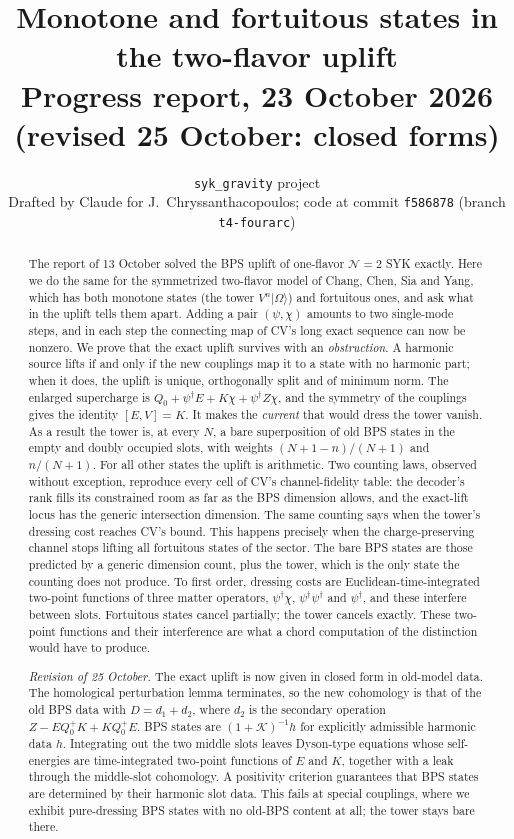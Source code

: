 \documentclass[11pt]{article}
\title{\bf Monotone and fortuitous states in the two-flavor uplift\\[6pt]\large Progress report, 23 October 2026 (revised 25 October: closed forms)}
\author{\texttt{syk\_gravity} project\\[2pt]\small Drafted by Claude for J.~Chryssanthacopoulos; code at commit
\texttt{f586878} (branch \texttt{t4-fourarc})}
\date{}
\newcommand{\Om}{|\Omega\rangle}
\theoremstyle{plain}
\theoremstyle{remark}
\numberwithin{equation}{section}
\begin{document}
\maketitle

\begin{abstract}
\noindent
The report of 13 October solved the BPS uplift of one-flavor $\mathcal N=2$ SYK exactly. Here we do the same for the
symmetrized two-flavor model of Chang, Chen, Sia and Yang, which has both monotone states (the tower $V^n\Om$) and
fortuitous ones, and ask what in the uplift tells them apart. Adding a pair $(\psi,\chi)$ amounts to two single-mode
steps, and in each step the connecting map of CV's long exact sequence can now be nonzero. We prove that the exact uplift
survives with an \emph{obstruction}. A harmonic source lifts if and only if the new couplings map it to a state with no
harmonic part; when it does, the uplift is unique, orthogonally split and of minimum norm. The enlarged supercharge is
$Q_0+\psi^\dagger E+K\chi+\psi^\dagger Z\chi$, and the symmetry of the couplings gives the identity $[E,V]=K$. It
makes the \emph{current} that would dress the tower vanish. As a result the tower is, at every $N$, a bare superposition
of old BPS states in the empty and doubly occupied slots, with weights $(N+1-n)/(N+1)$ and $n/(N+1)$. For all other
states the uplift is arithmetic. Two counting laws, observed without exception, reproduce every cell of CV's
channel-fidelity table: the decoder's rank fills its constrained room as far as the BPS dimension allows, and the
exact-lift locus has the generic intersection dimension. The same counting says when the tower's dressing cost reaches
CV's bound. This happens precisely when the
charge-preserving channel stops lifting all fortuitous states of the sector. The bare BPS states are those predicted by a
generic dimension count, plus the tower, which is the only state the counting does not produce. To first order, dressing
costs are Euclidean-time-integrated two-point functions of three matter operators, $\psi^\dagger\chi$,
$\psi^\dagger\psi^\dagger$ and $\psi^\dagger$, and these interfere between slots. Fortuitous states cancel partially; the
tower cancels exactly. These two-point functions and their interference are what a chord computation of the distinction
would have to produce.

\smallskip\noindent\emph{Revision of 25 October.} The exact uplift is now given in closed form in old-model data.
The homological perturbation lemma terminates, so the new cohomology is that of the old BPS data with
$D=d_1+d_2$, where $d_2$ is the secondary operation $Z-EQ_0^+K+KQ_0^+E$. BPS states are $(1+\mathcal K)^{-1}h$ for
explicitly admissible harmonic data $h$. Integrating out the two middle slots leaves Dyson-type equations whose
self-energies are time-integrated two-point functions of $E$ and $K$, together with a leak through the middle-slot
cohomology. A positivity criterion guarantees that BPS states are determined by their harmonic slot data. This fails at
special couplings, where we exhibit pure-dressing BPS states with no old-BPS content at all; the tower stays bare there.
\end{abstract}
\end{document}
